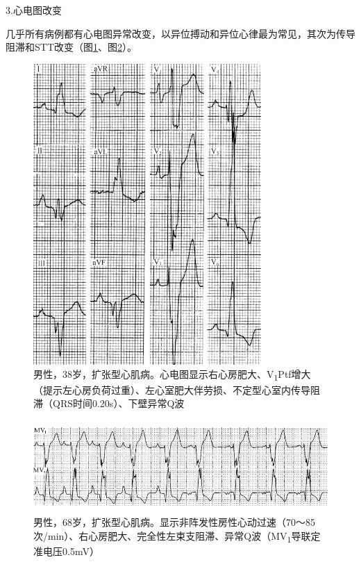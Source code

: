 3.心电图改变

几乎所有病例都有心电图异常改变，以异位搏动和异位心律最为常见，其次为传导阻滞和STT改变（图\ref{fig43-1}、图\ref{fig43-2}）。

\begin{figure}[!htbp]
 \centering
 \includegraphics[width=3.41667in,height=4.51042in]{./images/Image00704.jpg}
 \captionsetup{justification=centering}
 \caption{男性，38岁，扩张型心肌病。心电图显示右心房肥大、V\textsubscript{1}Ptf增大（提示左心房负荷过重）、左心室肥大伴劳损、不定型心室内传导阻滞（QRS时间0.20s）、下壁异常Q波}
 \label{fig43-1}
  \end{figure} 


\begin{figure}[!htbp]
 \centering
 \includegraphics[width=5.19792in,height=1.38542in]{./images/Image00705.jpg}
 \captionsetup{justification=centering}
 \caption{男性，68岁，扩张型心肌病。显示非阵发性房性心动过速（70～85次/min）、右心房肥大、完全性左束支阻滞、异常Q波（MV\textsubscript{1}导联定准电压0.5mV）}
 \label{fig43-2}
  \end{figure} 


